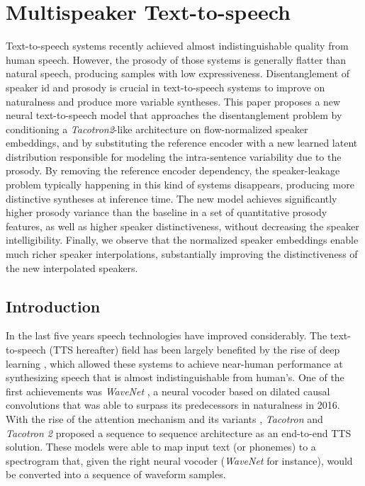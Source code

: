\chapter{Multispeaker Text-to-speech} \label{ch:tts}

Text-to-speech systems recently achieved almost indistinguishable quality from human speech. However, the prosody of those systems is generally flatter than natural speech, producing samples with low expressiveness. Disentanglement of speaker id and prosody is crucial in text-to-speech systems to improve on naturalness and produce more variable syntheses. This paper proposes a new neural text-to-speech model that approaches the disentanglement problem by conditioning a \textit{Tacotron2}-like architecture on flow-normalized speaker embeddings, and by substituting the reference encoder with a new learned latent distribution responsible for modeling the intra-sentence variability due to the prosody. By removing the reference encoder dependency, the speaker-leakage problem typically happening in this kind of systems disappears, producing more distinctive syntheses at inference time. The new model achieves significantly higher prosody variance than the baseline in a set of quantitative prosody features, as well as higher speaker distinctiveness, without decreasing the speaker intelligibility. Finally, we observe that the normalized speaker embeddings enable much richer speaker interpolations, substantially improving the distinctiveness of the new interpolated speakers.


\section{Introduction}
In the last five years speech technologies have improved considerably. The text-to-speech (TTS hereafter) field has been largely benefited by the rise of deep learning \cite{Sisman2021}, which allowed these systems to achieve near-human performance at synthesizing speech that is almost indistinguishable from human's. One of the first achievements was \textit{WaveNet} \cite{vanderoord2016}, a neural vocoder based on dilated causal convolutions that was able to surpass its predecessors in naturalness in 2016. With the rise of the attention mechanism and its variants \cite{bahdanau2015,vaswani2017,chaudhari2019}, \textit{Tacotron} \cite{Wang2017} and \textit{Tacotron 2} \cite{Shen2018,liu2019b} proposed a sequence to sequence architecture as an end-to-end TTS solution. These models were able to map input text (or phonemes) to a spectrogram that, given the right neural vocoder (\textit{WaveNet} for instance), would be converted into a sequence of waveform samples.

